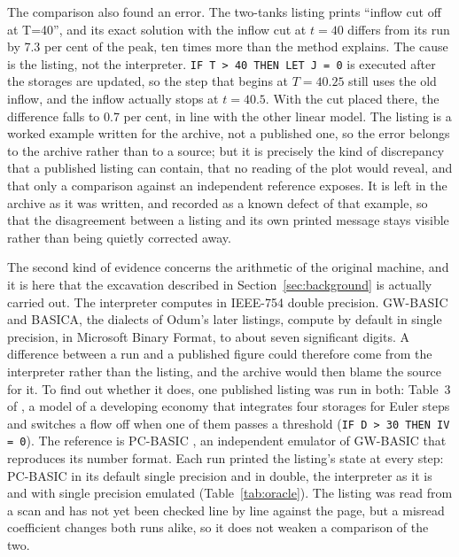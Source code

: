 The comparison also found an error. The two-tanks listing prints ``inflow cut off at T=40'', and its exact solution with the inflow cut at $t=40$ differs from its run by 7.3 per cent of the peak, ten times more than the method explains. The cause is the listing, not the interpreter. \texttt{IF T > 40 THEN LET J = 0} is executed after the storages are updated, so the step that begins at $T = 40.25$ still uses the old inflow, and the inflow actually stops at $t = 40.5$. With the cut placed there, the difference falls to 0.7 per cent, in line with the other linear model. The listing is a worked example written for the archive, not a published one, so the error belongs to the archive rather than to a source; but it is precisely the kind of discrepancy that a published listing can contain, that no reading of the plot would reveal, and that only a comparison against an independent reference exposes. It is left in the archive as it was written, and recorded as a known defect of that example, so that the disagreement between a listing and its own printed message stays visible rather than being quietly corrected away.

The second kind of evidence concerns the arithmetic of the original machine, and it is here that the excavation described in Section~\ref{sec:background} is actually carried out. The interpreter computes in IEEE-754 double precision. GW-BASIC and BASICA, the dialects of Odum's later listings, compute by default in single precision, in Microsoft Binary Format, to about seven significant digits. A difference between a run and a published figure could therefore come from the interpreter rather than the listing, and the archive would then blame the source for it. To find out whether it does, one published listing was run in both: Table~3 of \citet{odum1989}, a model of a developing economy that integrates four storages for \oracleSteps{} Euler steps and switches a flow off when one of them passes a threshold (\texttt{IF D > 30 THEN IV = 0}). The reference is PC-BASIC \citep{pcbasic}, an independent emulator of GW-BASIC that reproduces its number format. Each run printed the listing's state at every step: PC-BASIC in its default single precision and in double, the interpreter as it is and with single precision emulated (Table~\ref{tab:oracle}). The listing was read from a scan and has not yet been checked line by line against the page, but a misread coefficient changes both runs alike, so it does not weaken a comparison of the two.

